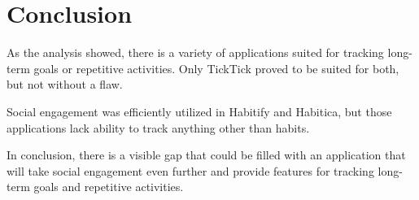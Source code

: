 
\section{Conclusion}\label{sec:conclusion}

As the analysis showed, there is a variety of applications suited for tracking long-term goals or repetitive activities.
Only TickTick proved to be suited for both, but not without a flaw.

Social engagement was efficiently utilized in Habitify and Habitica,
but those applications lack ability to track anything other than habits.

In conclusion, there is a visible gap that could be filled with an application that will take social engagement even further and provide
features for tracking long-term goals and repetitive activities.